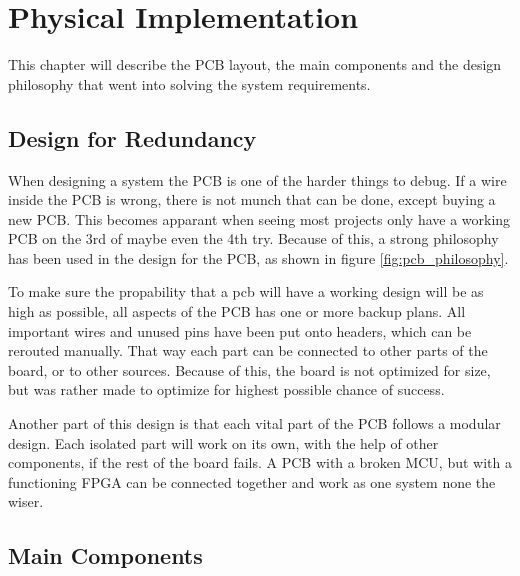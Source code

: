 \documentclass[../main/report.tex]{subfiles}
\begin{document}
\chapter{Physical Implementation}
\label{sec:pcb}

This chapter will describe the PCB layout, the main components and the design philosophy that went into solving the system requirements.


\section{Design for Redundancy}

When designing a system the PCB is one of the harder things to debug.
If a wire inside the PCB is wrong, there is not munch that can be done, except buying a new PCB.
This becomes apparant when seeing most projects only have a working PCB on the 3rd of maybe even the 4th try.
Because of this, a strong philosophy has been used in the design for the PCB, as shown in figure \ref{fig:pcb_philosophy}.

To make sure the propability that a pcb will have a working design will be as high as possible, all aspects of the PCB has one or more backup plans.
All important wires and unused pins have been put onto headers, which can be rerouted manually.
That way each part can be connected to other parts of the board, or to other sources.
Because of this, the board is not optimized for size, but was rather made to optimize for highest possible chance of success.

Another part of this design is that each vital part of the PCB follows a modular design.
Each isolated part will work on its own, with the help of other components, if the rest of the board fails.
A PCB with a broken MCU, but with a functioning FPGA can be connected together and work as one system none the wiser.

\section{Main Components}




\end{document}
